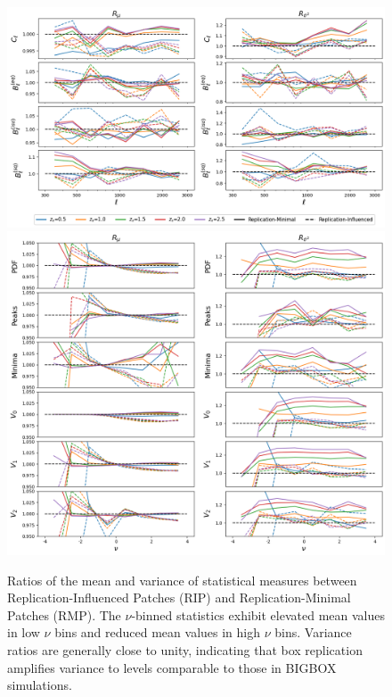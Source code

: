 \begin{figure}[p] 
    \centering 
    \includegraphics[width=\textwidth]{figures/results/BR_ratio_ell.png} 
    \includegraphics[width=\textwidth]{figures/results/BR_ratio_nu.png} 
    \caption[BIGBOX/TILED Ratios of the mean and variance of statistical measures for the RIPs and the RMPs]{Ratios of the mean and variance of statistical measures between Replication-Influenced Patches (RIP) and Replication-Minimal Patches (RMP). The $\nu$-binned statistics exhibit elevated mean values in low $\nu$ bins and reduced mean values in high $\nu$ bins. Variance ratios are generally close to unity, indicating that box replication amplifies variance to levels comparable to those in BIGBOX simulations.} \label{fig:boxreplication_main} 
\end{figure}


